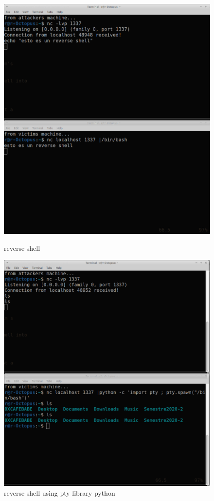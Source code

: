 \documentclass[10pt,a4paper]{article} %
\begin{document}
        \begin{figure}[h!]
            \centering
            \includegraphics[width=0.6\linewidth]{reverse.png}
            \caption{reverse shell}
            \includegraphics[width=0.6\linewidth]{global_reverse_shell.png}
            \caption{reverse shell using pty library python}
            \label{fig}
        \end{figure}












    \nocite{*}
    
    
\end{document}
